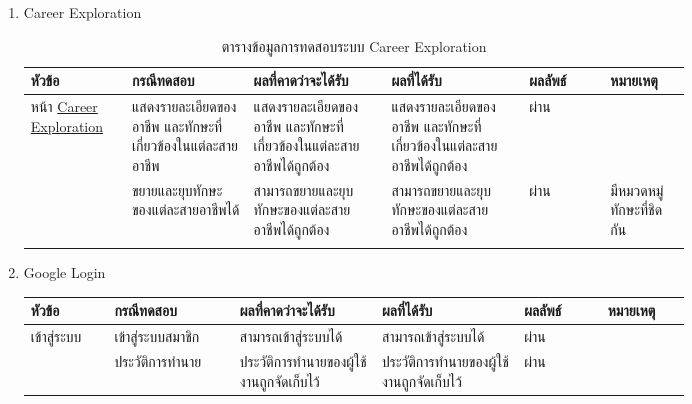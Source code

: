 \begin{enumerate}
    \item Career Exploration
          \begin{longtable}{|>{\raggedright\arraybackslash}p{0.1\linewidth}|>{\raggedright\arraybackslash}p{0.15\linewidth}|>{\raggedright\arraybackslash}p{0.17\linewidth}|>{\raggedright\arraybackslash}p{0.17\linewidth}|>{\centering}p{0.1\linewidth}|>{\raggedright\arraybackslash}p{0.1\linewidth}|} \hline
              หัวข้อ           & กรณีทดสอบ                                          & ผลที่คาดว่าจะได้รับ                                           & ผลที่ได้รับ                                                  & ผลลัพธ์ & หมายเหตุ    \\ \hline
              \endhead
              หน้า \hyperref[subsec:Career Exploration]{Career Exploration} & แสดงรายละเอียดของอาชีพ และทักษะที่เกี่ยวข้องในแต่ละสายอาชีพ & แสดงรายละเอียดของอาชีพ และทักษะที่เกี่ยวข้องในแต่ละสายอาชีพได้ถูกต้อง & แสดงรายละเอียดของอาชีพ และทักษะที่เกี่ยวข้องในแต่ละสายอาชีพได้ถูกต้อง & ผ่าน   &            \\ \cline{2-6}
                             & ขยายและยุบทักษะของแต่ละสายอาชีพได้                     & สามารถขยายและยุบทักษะของแต่ละสายอาชีพได้ถูกต้อง                 & สามารถขยายและยุบทักษะของแต่ละสายอาชีพได้ถูกต้อง                 & ผ่าน   & มีหมวดหมู่ทักษะที่ชิดกัน \\\hline
              \caption{ตารางข้อมูลการทดสอบระบบ Career Exploration}
              \label{tbl:test-scenario-cexploration}
          \end{longtable}
    \item Google Login
          \begin{longtable}{|>{\raggedright\arraybackslash}p{0.1\linewidth}|>{\raggedright\arraybackslash}p{0.15\linewidth}|>{\raggedright\arraybackslash}p{0.17\linewidth}|>{\raggedright\arraybackslash}p{0.17\linewidth}|>{\centering}p{0.1\linewidth}|>{\raggedright\arraybackslash}p{0.1\linewidth}|} \hline
              หัวข้อ       & กรณีทดสอบ        & ผลที่คาดว่าจะได้รับ                                    & ผลที่ได้รับ                                           & ผลลัพธ์ & หมายเหตุ \\ \hline
              \endhead
              เข้าสู่ระบบ   & เข้าสู่ระบบสมาชิก   & สามารถเข้าสู่ระบบได้                                  & สามารถเข้าสู่ระบบได้                                  & ผ่าน   &         \\ \cline{2-6}
                         & ประวัติการทำนาย    & ประวัติการทำนายของผู้ใช้งานถูกจัดเก็บไว้                    & ประวัติการทำนายของผู้ใช้งานถูกจัดเก็บไว้                    & ผ่าน   &         \\\hline

\end{longtable}
\end{enumerate}
